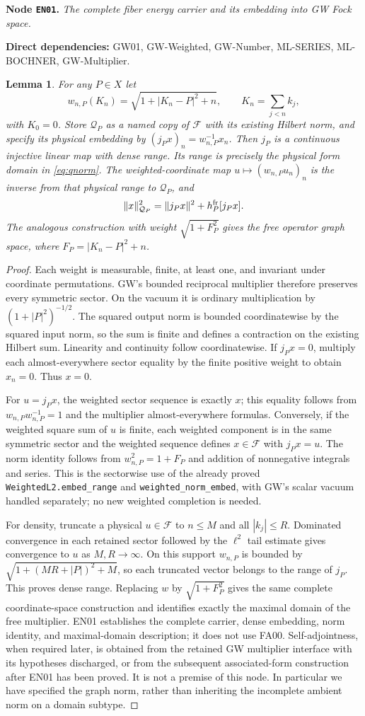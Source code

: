 \documentclass[11pt,a4paper]{article}
\newtheorem{lemma}[theorem]{Lemma}
\theoremstyle{remark}\newtheorem{remark}[theorem]{Remark}
\newcommand{\F}{\mathcal F}\newcommand{\Q}{\mathcal Q}\newcommand{\HH}{\mathcal H}
\newcommand{\node}[3]{\par\Needspace{6\baselineskip}\smallskip\hypertarget{node:#1}{}\label{nodepage:#1}\noindent\textbf{Node \texttt{#1}.} \textit{#2.}\par\noindent\textbf{Direct dependencies:} #3.\par}
\begin{document}
\node{EN01}{The complete fiber energy carrier and its embedding into GW Fock space}{GW01, GW-Weighted, GW-Number, ML-SERIES, ML-BOCHNER, GW-Multiplier}
\begin{lemma}\label{lem:energycoordinates}
For any $P\in X$ let
\[
 w_{n,P}(K_n)=\sqrt{1+|K_n-P|^2+n},\qquad K_n=\sum_{j<n}k_j,
\]
with $K_0=0$. Store $\Q_P$ as a named copy of $\F$ with its existing Hilbert norm, and specify its physical embedding by
$(j_Px)_n=w_{n,P}^{-1}x_n$.
Then $j_P$ is a continuous injective linear map with dense range. Its range is precisely the physical form domain in \eqref{eq:qnorm}. The weighted-coordinate map $u\mapsto(w_{n,P}u_n)_n$ is the inverse from that physical range to $\Q_P$, and
\[
 \|x\|_{\Q_P}^2=\|j_Px\|^2+h_P^{\rm fr}[j_Px].
\]
The analogous construction with weight $\sqrt{1+F_P^2}$ gives the free operator graph space, where $F_P=|K_n-P|^2+n$.
\end{lemma}
\begin{proof}
Each weight is measurable, finite, at least one, and invariant under coordinate permutations. GW's bounded reciprocal multiplier therefore preserves every symmetric sector. On the vacuum it is ordinary multiplication by $(1+|P|^2)^{-1/2}$. The squared output norm is bounded coordinatewise by the squared input norm, so the sum is finite and defines a contraction on the existing Hilbert sum. Linearity and continuity follow coordinatewise. If $j_Px=0$, multiply each almost-everywhere sector equality by the finite positive weight to obtain $x_n=0$. Thus $x=0$.

For $u=j_Px$, the weighted sector sequence is exactly $x$; this equality follows from $w_{n,P}w_{n,P}^{-1}=1$ and the multiplier almost-everywhere formulas. Conversely, if the weighted square sum of $u$ is finite, each weighted component is in the same symmetric sector and the weighted sequence defines $x\in\F$ with $j_Px=u$. The norm identity follows from $w_{n,P}^2=1+F_P$ and addition of nonnegative integrals and series. This is the sectorwise use of the already proved \texttt{WeightedL2.embed\_range} and \texttt{weighted\_norm\_embed}, with GW's scalar vacuum handled separately; no new weighted completion is needed.

For density, truncate a physical $u\in\F$ to $n\leq M$ and all $|k_j|\leq R$. Dominated convergence in each retained sector followed by the $\ell^2$ tail estimate gives convergence to $u$ as $M,R\to\infty$. On this support $w_{n,P}$ is bounded by $\sqrt{1+(MR+|P|)^2+M}$, so each truncated vector belongs to the range of $j_P$. This proves dense range. Replacing $w$ by $\sqrt{1+F_P^2}$ gives the same complete coordinate-space construction and identifies exactly the maximal domain of the free multiplier. EN01 establishes the complete carrier, dense embedding, norm identity, and maximal-domain description; it does not use FA00. Self-adjointness, when required later, is obtained from the retained GW multiplier interface with its hypotheses discharged, or from the subsequent associated-form construction after EN01 has been proved. It is not a premise of this node. In particular we have specified the graph norm, rather than inheriting the incomplete ambient norm on a domain subtype.
\end{proof}
\end{document}
